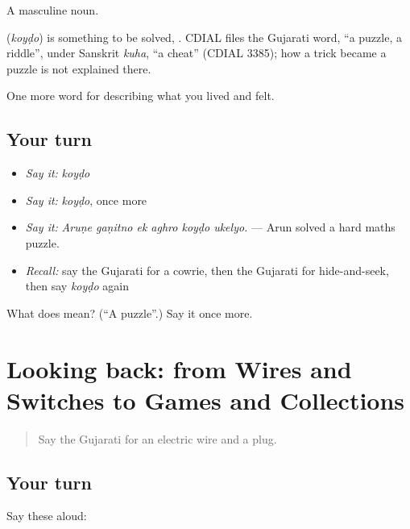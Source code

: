 A masculine noun.

\begin{cousinweb}
\textbf{} (\emph{koyḍo}) is something to be solved, \textbf{}. CDIAL files the Gujarati word, \textquotedblleft{}a puzzle, a riddle\textquotedblright{}, under Sanskrit \emph{kuha}, \textquotedblleft{}a cheat\textquotedblright{} (CDIAL 3385); how a trick became a puzzle is not explained there.
\end{cousinweb}

\begin{grammarlens}[title={What you've built}]
One more word for describing what you lived and felt.
\end{grammarlens}

\subsection*{Your turn}
\begin{itemize}
\raggedright
  \item \emph{Say it:} \emph{koyḍo}
  \item \emph{Say it:} \emph{koyḍo}, once more
  \item \emph{Say it:} \emph{Aruṇe gaṇitno ek aghro koyḍo ukelyo.} — Arun solved a hard maths puzzle.
  \item \emph{Recall:} say the Gujarati for a cowrie, then the Gujarati for hide-and-seek, then say \emph{koyḍo} again
\end{itemize}

\begin{tcolorbox}[breakable,colback=teal!4,colframe=teal!35!black,title={Before you move on}]
What does  mean? (\textquotedblleft{}A puzzle\textquotedblright{}.) Say it once more.
\end{tcolorbox}
\section[(dialogue)]{Looking back: from Wires and Switches to Games and Collections}

\label{lesson:GU-R524-review-517-524}



\begin{quote}
Say the Gujarati for an electric wire and a plug.
\end{quote}

\subsection*{Your turn}
Say these aloud:

